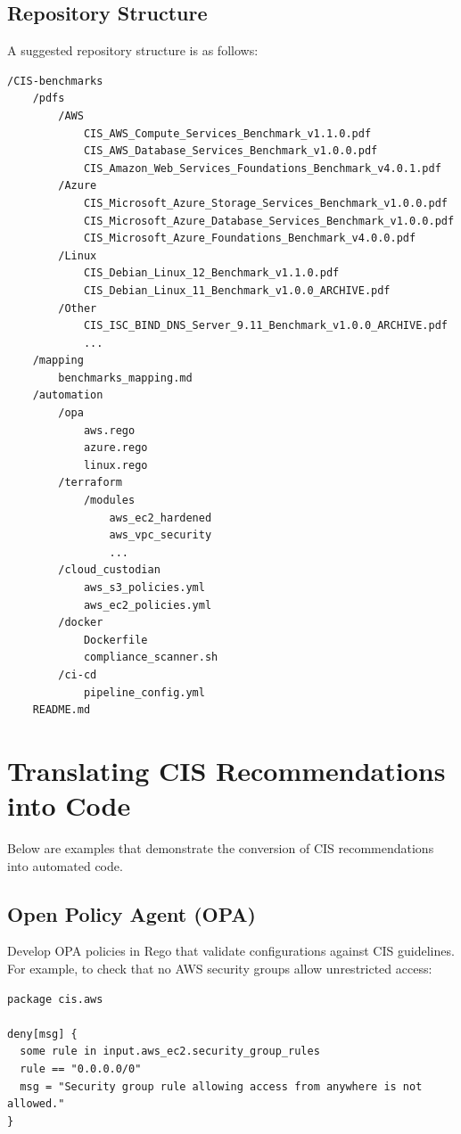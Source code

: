 \documentclass[12pt]{article}
\begin{document}
\subsection{Repository Structure}
A suggested repository structure is as follows:
\begin{lstlisting}[language={}, caption={Repository Structure}]
/CIS-benchmarks
    /pdfs
        /AWS
            CIS_AWS_Compute_Services_Benchmark_v1.1.0.pdf
            CIS_AWS_Database_Services_Benchmark_v1.0.0.pdf
            CIS_Amazon_Web_Services_Foundations_Benchmark_v4.0.1.pdf
        /Azure
            CIS_Microsoft_Azure_Storage_Services_Benchmark_v1.0.0.pdf
            CIS_Microsoft_Azure_Database_Services_Benchmark_v1.0.0.pdf
            CIS_Microsoft_Azure_Foundations_Benchmark_v4.0.0.pdf
        /Linux
            CIS_Debian_Linux_12_Benchmark_v1.1.0.pdf
            CIS_Debian_Linux_11_Benchmark_v1.0.0_ARCHIVE.pdf
        /Other
            CIS_ISC_BIND_DNS_Server_9.11_Benchmark_v1.0.0_ARCHIVE.pdf
            ...
    /mapping
        benchmarks_mapping.md
    /automation
        /opa
            aws.rego
            azure.rego
            linux.rego
        /terraform
            /modules
                aws_ec2_hardened
                aws_vpc_security
                ...
        /cloud_custodian
            aws_s3_policies.yml
            aws_ec2_policies.yml
        /docker
            Dockerfile
            compliance_scanner.sh
        /ci-cd
            pipeline_config.yml
    README.md
\end{lstlisting}

\section{Translating CIS Recommendations into Code}
Below are examples that demonstrate the conversion of CIS recommendations into automated code.

\subsection{Open Policy Agent (OPA)}
Develop OPA policies in Rego that validate configurations against CIS guidelines. For example, to check that no AWS security groups allow unrestricted access:
\begin{lstlisting}[language=Rego, caption={CIS Security Group Check in Rego}]
package cis.aws

deny[msg] {
  some rule in input.aws_ec2.security_group_rules
  rule == "0.0.0.0/0"
  msg = "Security group rule allowing access from anywhere is not allowed."
}
\end{lstlisting}
\end{document}
